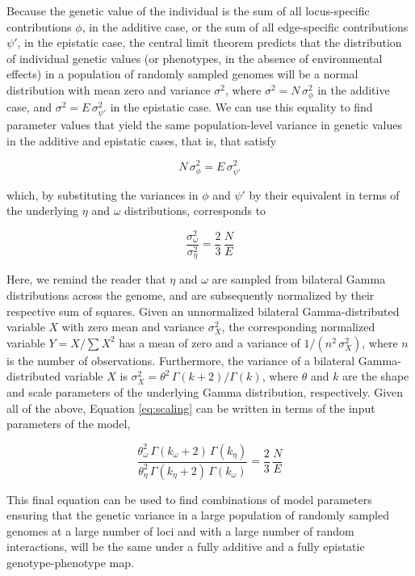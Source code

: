 \documentclass[]{article}
\begin{document}
Because the genetic value of the individual is the sum of all locus-specific contributions $\phi$, in the additive case, or the sum of all edge-specific contributions $\psi'$, in the epistatic case, the central limit theorem predicts that the distribution of individual genetic values (or phenotypes, in the absence of environmental effects) in a population of randomly sampled genomes will be a normal distribution with mean zero and variance $\sigma^2$, where $\sigma^2 = N \, \sigma_{\phi}^2$ in the additive case, and $\sigma^2 = E \, \sigma_{\psi'}^2$ in the epistatic case. We can use this equality to find parameter values that yield the same population-level variance in genetic values in the additive and epistatic cases, that is, that satisfy

\begin{equation}
	N \, \sigma_{\phi}^2 = E \, \sigma_{\psi'}^2
\end{equation}

which, by substituting the variances in $\phi$ and $\psi'$ by their equivalent in terms of the underlying $\eta$ and $\omega$ distributions, corresponds to

\begin{equation}
	\frac{\sigma_{\omega}^2}{\sigma_{\eta}^2} = \frac{2}{3}\,\frac{N}{E}
	\label{eq:scaling}
\end{equation}

Here, we remind the reader that $\eta$ and $\omega$ are sampled from bilateral Gamma distributions across the genome, and are subsequently normalized by their respective sum of squares. Given an unnormalized bilateral Gamma-distributed variable $X$ with zero mean and variance $\sigma_X^2$, the corresponding normalized variable $Y = X / \sum X^2$ has a mean of zero and a variance of $1/(n^2 \, \sigma_X^2)$, where $n$ is the number of observations. Furthermore, the variance of a bilateral Gamma-distributed variable $X$ is $\sigma_X^2 = \theta^2 \, \Gamma(k+2) / \Gamma(k) $, where $\theta$ and $k$ are the shape and scale parameters of the underlying Gamma distribution, respectively. Given all of the above, Equation \ref{eq:scaling} can be written in terms of the input parameters of the model,

\begin{equation}
	\frac{\theta_{\omega}^2 \, \Gamma(k_{\omega}+2) \, \Gamma(k_{\eta})}{\theta_{\eta}^2 \, \Gamma(k_{\eta}+2) \, \Gamma(k_{\omega})} = \frac{2}{3} \, \frac{N}{E}
\end{equation}

This final equation can be used to find combinations of model parameters ensuring that the genetic variance in a large population of randomly sampled genomes at a large number of loci and with a large number of random interactions, will be the same under a fully additive and a fully epistatic genotype-phenotype map.\\
\end{document}
